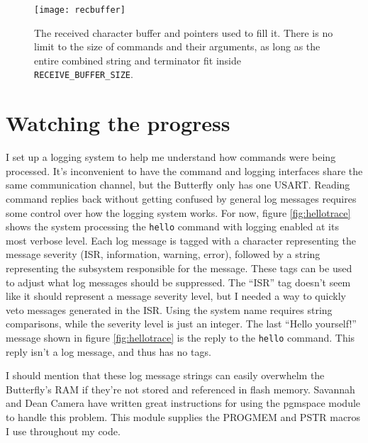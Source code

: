\begin{figure}[ht]
    \begin{center}
        \texttt{[image: recbuffer]}
        \caption{The received character buffer and pointers used to fill it.  There is no limit to the size of commands and their arguments, as long as the entire combined string and terminator fit inside \texttt{RECEIVE\_BUFFER\_SIZE}.\label{fig:recbuffer}}
    \end{center}
\end{figure}

\clearpage{}
\section{Watching the progress}
I set up a logging system to help me understand how commands were being processed.  It's inconvenient to have the command and logging interfaces share the same communication channel, but the Butterfly only has one USART.  Reading command replies back without getting confused by general log messages requires some control over how the logging system works.  For now, figure \ref{fig:hellotrace} shows the system processing the \texttt{hello} command with logging enabled at its most verbose level.  Each log message is tagged with a character representing the message severity (ISR, information, warning, error), followed by a string representing the subsystem responsible for the message.  These tags can be used to adjust what log messages should be suppressed.  The ``ISR'' tag doesn't seem like it should represent a message severity level, but I needed a way to quickly veto messages generated in the ISR.  Using the system name requires string comparisons, while the severity level is just an integer.  The last ``Hello yourself!'' message shown in figure \ref{fig:hellotrace} is the reply to the \texttt{hello} command. This reply isn't a log message, and thus has no tags.

I should mention that these log message strings can easily overwhelm the Butterfly's RAM if they're not stored and referenced in flash memory.  Savannah\cite{url:savannah:pgmspace} and Dean Camera\cite{url:deancamera:pgmspace} have written great instructions for using the pgmspace module to handle this problem.  This module supplies the PROGMEM and PSTR macros I use throughout my code.

